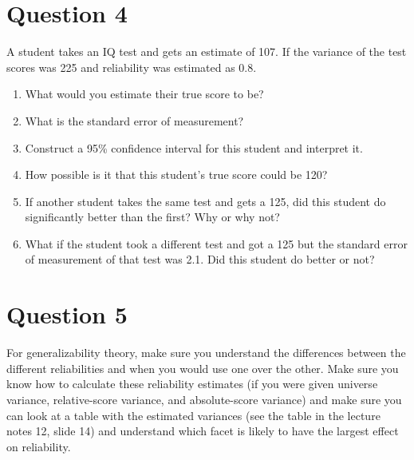 \documentclass[11pt]{amsart}
\begin{document}
\section*{Question 4}
A student takes an IQ test and gets an estimate of 107. If the variance of the test scores was 225 and reliability was estimated as 0.8.

\begin{enumerate}
\item What would you estimate their true score to be?
\item What is the standard error of measurement?
\item Construct a 95\% confidence interval for this student and interpret it.
\item How possible is it that this student's true score could be 120?
\item If another student takes the same test and gets a 125, did this student do significantly better than the first? Why or why not?
\item What if the student took a different test and got a 125 but the standard error of measurement of that test was 2.1. Did this student do better or not?
\end{enumerate}


\section*{Question 5}
For generalizability theory, make sure you understand the differences between the different reliabilities and when you would use one over the other. Make sure you know how to calculate these reliability estimates (if you were given universe variance, relative-score variance, and absolute-score variance) and make sure you can look at a table with the estimated variances (see the table in the lecture notes 12, slide 14) and understand which facet is likely to have the largest effect on reliability.
\end{document}
